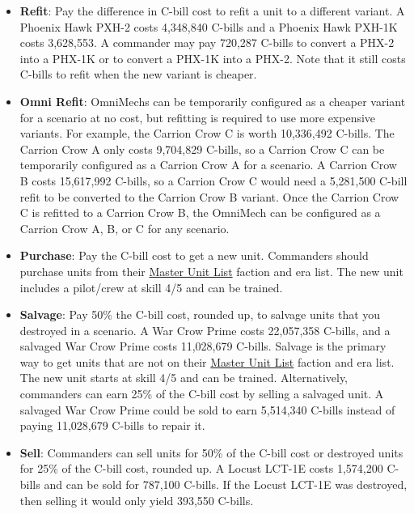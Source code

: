 \begin{itemize}
\item {\bfseries Refit}: Pay the difference in C-bill cost to refit a unit to a different variant.
A Phoenix Hawk PXH-2 costs 4,348,840 C-bills and a Phoenix Hawk PXH-1K costs 3,628,553.
A commander may pay 720,287 C-bills to convert a PHX-2 into a PHX-1K or to convert a PHX-1K into a PHX-2.
Note that it still costs C-bills to refit when the new variant is cheaper.

\item {\bfseries Omni Refit}: OmniMechs can be temporarily configured as a cheaper variant for a scenario at no cost, but refitting is required to use more expensive variants.
For example, the Carrion Crow C is worth 10,336,492 C-bills.
The Carrion Crow A only costs 9,704,829 C-bills, so a Carrion Crow C can be temporarily configured as a Carrion Crow A for a scenario.
A Carrion Crow B costs 15,617,992 C-bills, so a Carrion Crow C would need a 5,281,500 C-bill refit to be converted to the Carrion Crow B variant.
Once the Carrion Crow C is refitted to a Carrion Crow B, the OmniMech can be configured as a Carrion Crow A, B, or C for any scenario.

\item {\bfseries Purchase}: Pay the C-bill cost to get a new unit.
Commanders should purchase units from their \href{http://www.masterunitlist.info}{Master Unit List} faction and era list.
The new unit includes a pilot/crew at skill 4/5 and can be trained.

\item {\bfseries Salvage}: Pay 50\% the C-bill cost, rounded up, to salvage units that you destroyed in a scenario.
A War Crow Prime costs 22,057,358 C-bills, and a salvaged War Crow Prime costs 11,028,679 C-bills.
Salvage is the primary way to get units that are not on their \href{http://www.masterunitlist.info}{Master Unit List} faction and era list.
The new unit starts at skill 4/5 and can be trained.
Alternatively, commanders can earn 25\% of the C-bill cost by selling a salvaged unit.
A salvaged War Crow Prime could be sold to earn 5,514,340 C-bills instead of paying 11,028,679 C-bills to repair it.

\item {\bfseries Sell}: Commanders can sell units for 50\% of the C-bill cost or destroyed units for 25\% of the C-bill cost, rounded up.
A Locust LCT-1E costs 1,574,200 C-bills and can be sold for 787,100 C-bills.
If the Locust LCT-1E was destroyed, then selling it would only yield 393,550 C-bills.

\end{itemize}
